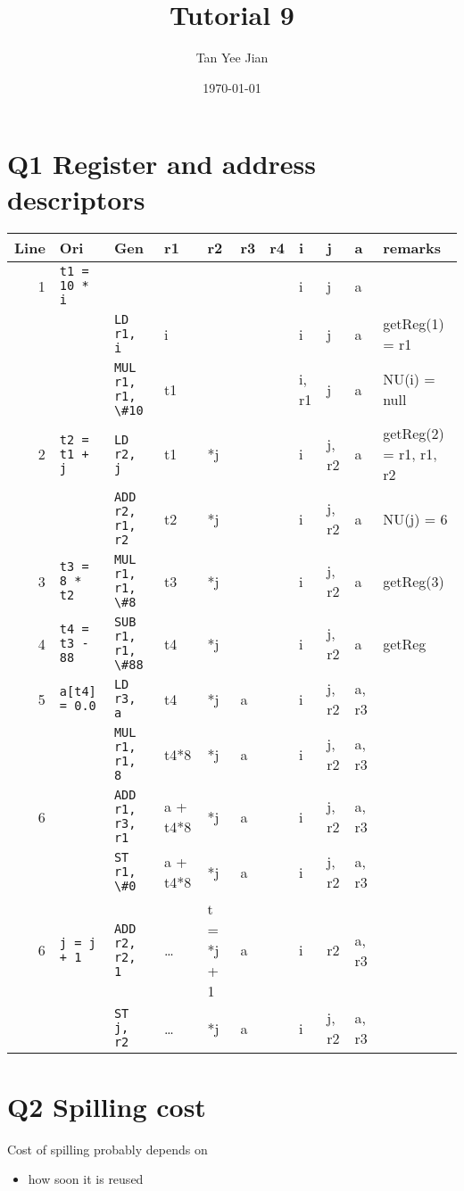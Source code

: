 \documentclass[11pt]{article}
\author{Tan Yee Jian}
\date{\today}
\title{Tutorial 9}
\begin{document}
\maketitle
\tableofcontents


\section{Q1 Register and address descriptors}
\label{sec:org7d76450}
\begin{center}
\begin{tabular}{rllllllllll}
Line & Ori & Gen & r1 & r2 & r3 & r4 & i & j & a & remarks\\
\hline
1 & \texttt{t1 = 10 * i} &  &  &  &  &  & i & j & a & \\
 &  & \texttt{LD r1, i} & i &  &  &  & i & j & a & getReg(1) = r1\\
 &  & \texttt{MUL r1, r1, \textbackslash{}\#10} & t1 &  &  &  & i, r1 & j & a & NU(i) = null\\
2 & \texttt{t2 = t1 + j} & \texttt{LD r2, j} & t1 & *j &  &  & i & j, r2 & a & getReg(2) = r1, r1, r2\\
 &  & \texttt{ADD r2, r1, r2} & t2 & *j &  &  & i & j, r2 & a & NU(j) = 6\\
3 & \texttt{t3 = 8 * t2} & \texttt{MUL r1, r1, \textbackslash{}\#8} & t3 & *j &  &  & i & j, r2 & a & getReg(3)\\
4 & \texttt{t4 = t3 - 88} & \texttt{SUB r1, r1, \textbackslash{}\#88} & t4 & *j &  &  & i & j, r2 & a & getReg\\
5 & \texttt{a[t4] = 0.0} & \texttt{LD r3, a} & t4 & *j & a &  & i & j, r2 & a, r3 & \\
 &  & \texttt{MUL r1, r1, 8} & t4*8 & *j & a &  & i & j, r2 & a, r3 & \\
6 &  & \texttt{ADD r1, r3, r1} & a + t4*8 & *j & a &  & i & j, r2 & a, r3 & \\
 &  & \texttt{ST r1, \textbackslash{}\#0} & a + t4*8 & *j & a &  & i & j, r2 & a, r3 & \\
6 & \texttt{j = j + 1} & \texttt{ADD r2, r2, 1} & \ldots{} & t = *j + 1 & a &  & i & r2 & a, r3 & \\
 &  & \texttt{ST j, r2} & \ldots{} & *j & a &  & i & j, r2 & a, r3 & \\
\end{tabular}
\end{center}
\section{Q2 Spilling cost}
\label{sec:org6898dfb}
Cost of spilling probably depends on
\begin{itemize}
\item how soon it is reused
\end{itemize}
\end{document}
